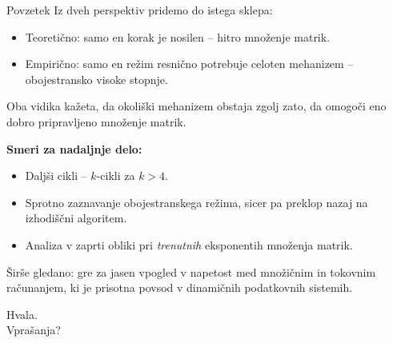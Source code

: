 \documentclass[aspectratio=169,10pt]{beamer}
\begin{document}
\begin{frame}{Povzetek}
  Iz dveh perspektiv pridemo do istega sklepa:
  \begin{itemize}
    \item \alert{Teoretično}: samo en korak je nosilen -- hitro množenje matrik.
    \item \alert{Empirično}: samo en režim resnično potrebuje celoten mehanizem -- obojestransko visoke stopnje.
  \end{itemize}

  \vspace{0.4em}
  Oba vidika kažeta, da okoliški mehanizem obstaja zgolj zato, \alert{da omogoči eno dobro pripravljeno množenje matrik}.

  \vspace{0.6em}
  \textbf{Smeri za nadaljnje delo:}
  \begin{itemize}
    \item Daljši cikli -- $k$-cikli za $k > 4$.
    \item Sprotno zaznavanje obojestranskega režima, sicer pa preklop nazaj na izhodiščni algoritem.
    \item Analiza v zaprti obliki pri \emph{trenutnih} eksponentih množenja matrik.
  \end{itemize}

  \vspace{0.3em}
  Širše gledano: gre za jasen vpogled v napetost med \alert{množičnim in tokovnim računanjem}, ki je prisotna povsod v dinamičnih podatkovnih sistemih.
\end{frame}

\begin{frame}[standout]
  Hvala. \\[0.5em]
  \large Vprašanja?
\end{frame}
\end{document}
